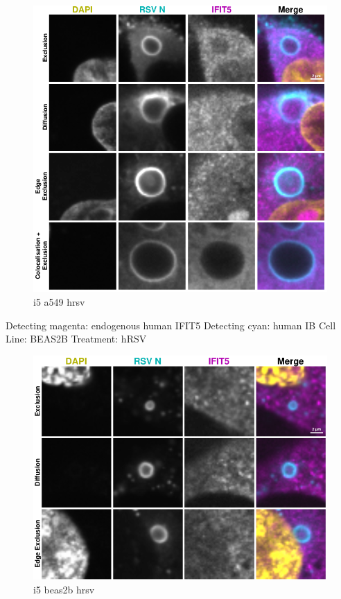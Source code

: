 \begin{figure}
    \centering
    \includegraphics[width=1\linewidth]{09. Chapter 4/Figs/02. Infection/07. a549 i5.pdf}
    \caption[i5 a549 hrsv]{i5 a549 hrsv}
    \label{fig:i5 a549 hrsv}
\end{figure}

Detecting magenta: endogenous human IFIT5 \newline
Detecting cyan: human IB \newline
Cell Line: BEAS2B \newline
Treatment: hRSV \newline

\begin{figure}
    \centering
    \includegraphics[width=1\linewidth]{09. Chapter 4/Figs/02. Infection/08. beas2b i5.pdf}
    \caption[i5 beas2b hrsv]{i5 beas2b hrsv}
    \label{fig:i5 beas2b hrsv}
\end{figure}

